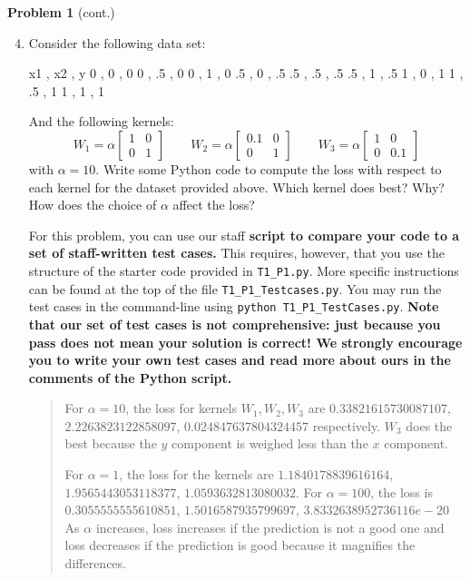 \documentclass[submit]{harvardml}
\begin{document}
\newpage

\begin{framed}
\noindent\textbf{Problem 1} (cont.)\\
\begin{enumerate}
\setcounter{enumi}{3}
\item Consider the following data set:
\begin{csv}
x1 , x2 , y 
  0 , 0 , 0
  0 , .5 , 0
  0 , 1 , 0 
  .5 , 0 , .5
  .5 , .5 , .5
  .5 , 1 , .5
  1 , 0 , 1
  1 , .5 , 1
  1 , 1 , 1 
\end{csv}
And the following kernels:
\begin{equation*} 
W_1 = \alpha \begin{bmatrix}
  1 & 0 \\
  0 & 1 
\end{bmatrix}
\qquad
W_2 = \alpha \begin{bmatrix}
  0.1 & 0 \\
  0 & 1 
\end{bmatrix}
\qquad
W_3 = \alpha \begin{bmatrix}
  1 & 0 \\
  0 & 0.1 
\end{bmatrix}
\end{equation*} 
with $\alpha = 10$. Write some Python code to compute the loss with
respect to each kernel for the dataset provided above. Which kernel
does best?  Why?  How does the choice of $\alpha$ affect the loss? 

For this problem, you can use our staff \textbf{script to compare your code to a set of staff-written test cases.} This requires, however, that you use the structure of the starter code provided in \texttt{T1\_P1.py}. More specific instructions can be found at the top of the file \texttt{T1\_P1\_Testcases.py}. You may run the test cases in the command-line using \texttt{python T1\_P1\_TestCases.py}.
\textbf{Note that our set of test cases is not comprehensive: just because you pass does not mean your solution is correct! We strongly encourage you to write your own test cases and read more about ours in the comments of the Python script.}

\begin{quote}
    For $\alpha = 10$, the loss for kernels $W_1, W_2, W_3$ are $0.33821615730087107$, $2.2263823122858097$, $0.024847637804324457$ respectively. $W_3$ does the best because the $y$ component is weighed less than the $x$ component.
    
    For $\alpha = 1$, the loss for the kernels are $1.1840178839616164$, $1.9565443053118377$, $1.0593632813080032$. For $\alpha = 100$, the loss is $0.3055555555610851$, $1.5016587935799697$, $3.8332638952736116e-20$
    As $\alpha$ increases, loss increases if the prediction is not a good one and loss decreases if the prediction is good because it magnifies the differences.
\end{quote}


\end{enumerate}
\end{framed}
\end{document}
